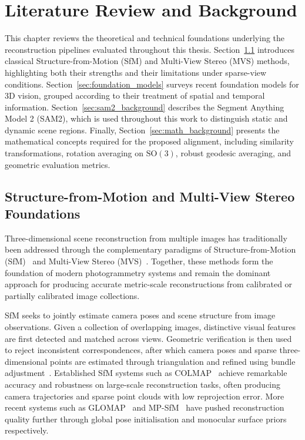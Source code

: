 \chapter{Literature Review and Background}
\label{c:background}

This chapter reviews the theoretical and technical foundations underlying the reconstruction pipelines evaluated throughout this thesis. Section~\ref{sec:sfm_mvs_foundations} introduces classical Structure-from-Motion (SfM) and Multi-View Stereo (MVS) methods, highlighting both their strengths and their limitations under sparse-view conditions. Section~\ref{sec:foundation_models} surveys recent foundation models for 3D vision, grouped according to their treatment of spatial and temporal information. Section~\ref{sec:sam2_background} describes the Segment Anything Model 2 (SAM2), which is used throughout this work to distinguish static and dynamic scene regions. Finally, Section~\ref{sec:math_background} presents the mathematical concepts required for the proposed alignment, including similarity transformations, rotation averaging on $\mathrm{SO}(3)$, robust geodesic averaging, and geometric evaluation metrics.

\section{Structure-from-Motion and Multi-View Stereo Foundations}
\label{sec:sfm_mvs_foundations}

Three-dimensional scene reconstruction from multiple images has traditionally been addressed through the complementary paradigms of Structure-from-Motion (SfM)~\cite{hartley2004multiple,schoenberger2016sfm} and Multi-View Stereo (MVS)~\cite{schoenberger2016mvs}. Together, these methods form the foundation of modern photogrammetry systems and remain the dominant approach for producing accurate metric-scale reconstructions from calibrated or partially calibrated image collections.

SfM seeks to jointly estimate camera poses and scene structure from image observations. Given a collection of overlapping images, distinctive visual features are first detected and matched across views. Geometric verification is then used to reject inconsistent correspondences, after which camera poses and sparse three-dimensional points are estimated through triangulation and refined using bundle adjustment~\cite{hartley2004multiple,schoenberger2016sfm}. Established SfM systems such as COLMAP~\cite{schoenberger2016sfm} achieve remarkable accuracy and robustness on large-scale reconstruction tasks, often producing camera trajectories and sparse point clouds with low reprojection error. More recent systems such as GLOMAP~\cite{pan2024glomap} and MP-SfM~\cite{pataki2025mpsfmmonocularsurfacepriors} have pushed reconstruction quality further through global pose initialisation and monocular surface priors respectively.

